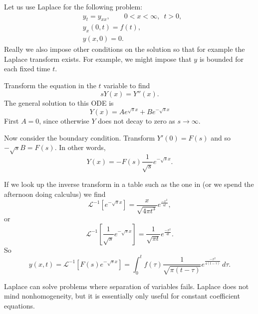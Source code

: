 \begin{example}
Let us use Laplace for the following problem:
\begin{align*}
& y_t = y_{xx}, \qquad 0 < x < \infty, \enspace t > 0,\\
& y_x(0,t) = f(t), \\
& y(x,0) = 0 .
\end{align*}
Really we also impose other conditions on the solution so that for example
the Laplace transform exists.  For example, we might impose that $y$ is
bounded for each fixed time $t$.

Transform the equation in the $t$ variable to find
\begin{equation*}
sY(x) = Y''(x) .
\end{equation*}
The general solution to this ODE is
\begin{equation*}
Y(x) = A e^{\sqrt{s}x} + B e^{-\sqrt{s} x}
\end{equation*}
First $A=0$, since otherwise $Y$ does not decay to zero as $s \to \infty$.

Now consider the boundary condition.
Transform $Y'(0) = F(s)$ and so $-\sqrt{s}B = F(s)$.
In other words,
\begin{equation*}
Y(x) = - F(s) \frac{1}{\sqrt{s}} e^{-\sqrt{s} x} .
\end{equation*}

If we look up the inverse transform in a table such as the one in
 (or we spend the afternoon
doing calculus) we find 
\begin{equation*}
{\mathcal L}^{-1}\left[e^{-\sqrt{s} x}\right] =
\frac{x}{\sqrt{4\pi t^3}} e^{\frac{-x^2}{4t}} ,
\end{equation*}
or
\begin{equation*}
{\mathcal L}^{-1}\left[\frac{1}{\sqrt{s}} e^{-\sqrt{s} x}\right] =
\frac{1}{\sqrt{\pi t}} e^{\frac{-x^2}{4t}} .
\end{equation*}
So
\begin{equation*}
y(x,t) =
{\mathcal L}^{-1} \left[
F(s) e^{-\sqrt{s} x}\right]
=
\int_0^t
f(\tau) 
\frac{1}{\sqrt{\pi {(t-\tau)}}} e^{\frac{-x^2}{4(t-\tau)}} \, d\tau .
\end{equation*}
\end{example}

Laplace can solve problems where separation of variables fails.
Laplace does not mind nonhomogeneity, but it is essentially only useful for
constant coefficient equations.

